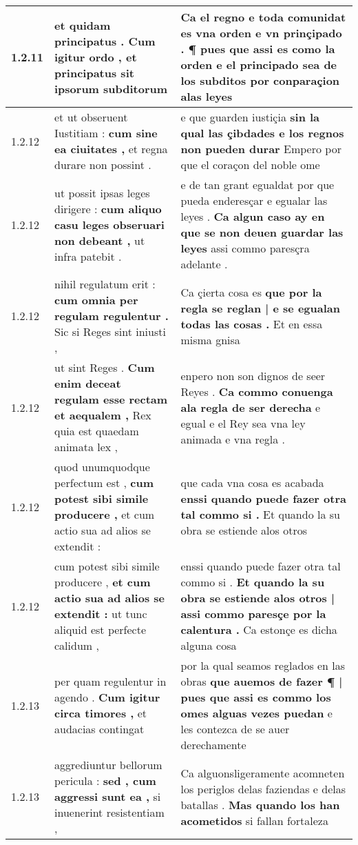 \begin{tabular}{|p{1cm}|p{6.5cm}|p{6.5cm}|}
1.2.11 & et quidam principatus . \textbf{ Cum igitur ordo , } et principatus sit ipsorum subditorum & Ca el regno e toda comunidat es vna orden e vn prinçipado . \textbf{ ¶ pues que assi es como la orden } e el principado sea de los subditos por conparaçion alas leyes \\\hline
1.2.12 & et ut obseruent Iustitiam : \textbf{ cum sine ea ciuitates , } et regna durare non possint . & e que guarden iustiçia \textbf{ sin la qual las çibdades e los regnos non pueden durar } Empero por que el coraçon del noble ome \\\hline
1.2.12 & ut possit ipsas leges dirigere : \textbf{ cum aliquo casu leges obseruari non debeant , } ut infra patebit . & e de tan grant egualdat por que pueda enderesçar e egualar las leyes . \textbf{ Ca algun caso ay en que se non deuen guardar las leyes } assi commo paresçra adelante . \\\hline
1.2.12 & nihil regulatum erit : \textbf{ cum omnia per regulam regulentur . } Sic si Reges sint iniusti , & Ca çierta cosa es \textbf{ que por la regla se reglan | e se egualan todas las cosas . } Et en essa misma gnisa \\\hline
1.2.12 & ut sint Reges . \textbf{ Cum enim deceat regulam esse rectam et aequalem , } Rex quia est quaedam animata lex , & enpero non son dignos de seer Reyes . \textbf{ Ca commo conuenga ala regla de ser derecha } e egual e el Rey sea vna ley animada e vna regla . \\\hline
1.2.12 & quod unumquodque perfectum est , \textbf{ cum potest sibi simile producere , } et cum actio sua ad alios se extendit : & que cada vna cosa es acabada \textbf{ enssi quando puede fazer otra tal commo si . } Et quando la su obra se estiende alos otros \\\hline
1.2.12 & cum potest sibi simile producere , \textbf{ et cum actio sua ad alios se extendit : } ut tunc aliquid est perfecte calidum , & enssi quando puede fazer otra tal commo si . \textbf{ Et quando la su obra se estiende alos otros | assi commo paresçe por la calentura . } Ca estonçe es dicha alguna cosa \\\hline
1.2.13 & per quam regulentur in agendo . \textbf{ Cum igitur circa timores , } et audacias contingat & por la qual seamos reglados en las obras \textbf{ que auemos de fazer ¶ | pues que assi es commo los omes alguas vezes puedan } e les contezca de se auer derechamente \\\hline
1.2.13 & aggrediuntur bellorum pericula : \textbf{ sed , cum aggressi sunt ea , } si inuenerint resistentiam , & Ca alguonsligeramente acomneten los periglos delas faziendas e delas batallas . \textbf{ Mas quando los han acometidos } si fallan fortaleza \\\hline

\end{tabular}
